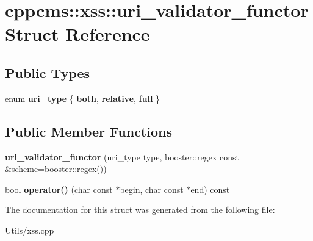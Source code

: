 \hypertarget{structcppcms_1_1xss_1_1uri__validator__functor}{\section{cppcms\-:\-:xss\-:\-:uri\-\_\-validator\-\_\-functor Struct Reference}
\label{structcppcms_1_1xss_1_1uri__validator__functor}
}
\subsection*{Public Types}
\begin{DoxyCompactItemize}
\item 
enum {\bfseries uri\-\_\-type} \{ {\bfseries both}, 
{\bfseries relative}, 
{\bfseries full}
 \}
\end{DoxyCompactItemize}
\subsection*{Public Member Functions}
\begin{DoxyCompactItemize}
\item 
\hypertarget{structcppcms_1_1xss_1_1uri__validator__functor_a868074df09cc841e9a35b6899e33c02a}{{\bfseries uri\-\_\-validator\-\_\-functor} (uri\-\_\-type type, booster\-::regex const \&scheme=booster\-::regex())}\label{structcppcms_1_1xss_1_1uri__validator__functor_a868074df09cc841e9a35b6899e33c02a}

\item 
\hypertarget{structcppcms_1_1xss_1_1uri__validator__functor_a16fc5203e0712f51e9b956998612c1d7}{bool {\bfseries operator()} (char const $\ast$begin, char const $\ast$end) const }\label{structcppcms_1_1xss_1_1uri__validator__functor_a16fc5203e0712f51e9b956998612c1d7}

\end{DoxyCompactItemize}


The documentation for this struct was generated from the following file\-:\begin{DoxyCompactItemize}
\item 
Utils/xss.\-cpp\end{DoxyCompactItemize}
